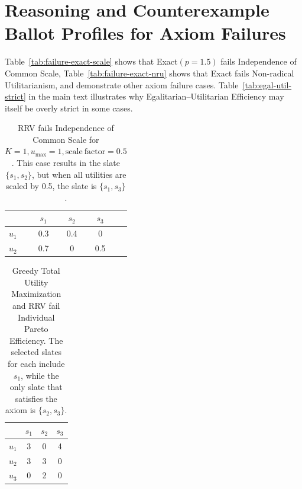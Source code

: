 \documentclass[11pt]{article}
\begin{document}
\section{Reasoning and Counterexample Ballot Profiles for Axiom Failures} \label{app:voting-failures}

Table~\ref{tab:failure-exact-scale} shows that Exact$(p=1.5)$ fails Independence of Common Scale, Table~\ref{tab:failure-exact-nru} shows that Exact fails Non-radical Utilitarianism, and  demonstrate other axiom failure cases. Table~\ref{tab:egal-util-strict} in the main text illustrates why Egalitarian--Utilitarian Efficiency may itself be overly strict in some cases.

\begin{table}[t]
\centering
\begin{tabular}{lcccc}
\hline
 & $s_1$ & $s_2$ & $s_3$ \\
\hline
$u_1$ & 0.3 & 0.4 & 0 \\
$u_2$ & 0.7 & 0 & 0.5 \\
\hline
\end{tabular}
\caption{RRV fails Independence of Common Scale for $K=1, u_\mathrm{max}=1, \mathrm{scale\ factor}=0.5$. This case results in the slate $\{s_1, s_2\}$, but when all utilities are scaled by 0.5, the slate is $\{s_1, s_3\}$.}
\label{tab:failure-rrv-scale}
\end{table}

\begin{table}[t]
\centering
\begin{tabular}{lccc}
\hline
 & $s_1$ & $s_2$ & $s_3$ \\
\hline
$u_1$ & 3 & 0 & 4 \\
$u_2$ & 3 & 3 & 0 \\
$u_3$ & 0 & 2 & 0 \\
\hline
\end{tabular}
\caption{Greedy Total Utility Maximization and RRV fail Individual Pareto Efficiency. The selected slates for each include $s_1$, while the only slate that satisfies the axiom is $\{s_2, s_3\}$.}
\label{tab:failure-greedy-indiv-pareto}
\end{table}
\end{document}
